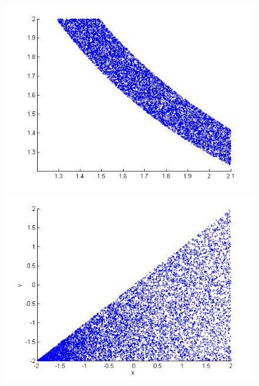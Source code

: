\documentclass{article}
\newcommand{\nn}{0.16}
\begin{document}
\begin{figure}
\begin{center}
\begin{minipage}[b]{\nn\textwidth}
        \end{minipage}%
\begin{minipage}[b]{\nn\textwidth}
                \includegraphics[width=1\textwidth]{Figs/col_m1v1_when_p_is_3_and_v2_is_0_dot_2.png}
        \end{minipage}%
\hspace{4mm}
\begin{minipage}[b]{\nn\textwidth}
                \includegraphics[width=1\textwidth]{Figs/col_v1v2.png}
        \end{minipage}%

\end{center}
\end{figure}
\end{document}
